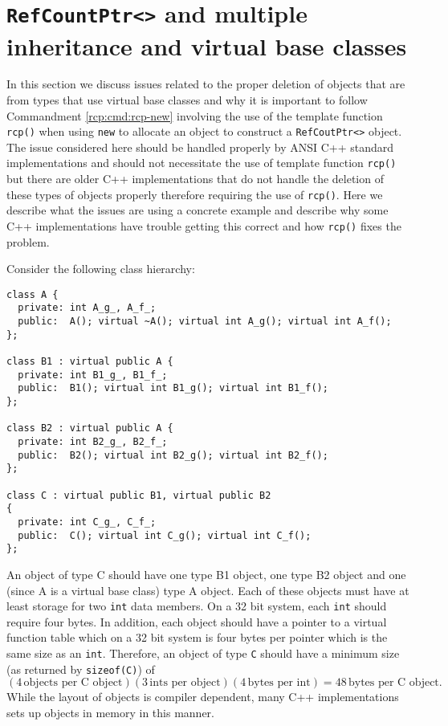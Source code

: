 %
\section{\texttt{RefCountPtr<>} and multiple inheritance and virtual base classes}
\label{rcp:apdx:mivbc}
%

In this section we discuss issues related to the proper deletion of
objects that are from types that use virtual base classes and why it
is important to follow Commandment \ref{rcp:cmd:rcp-new} involving the
use of the template function \texttt{rcp()} when using \texttt{new} to
allocate an object to construct a \texttt{RefCoutPtr<>} object.  The
issue considered here should be handled properly by ANSI C++ standard
implementations and should not necessitate the use of template
function \texttt{rcp()} but there are older C++ implementations that
do not handle the deletion of these types of objects properly
therefore requiring the use of \texttt{rcp()}.  Here we describe what
the issues are using a concrete example and describe why some C++
implementations have trouble getting this correct and how
\texttt{rcp()} fixes the problem.

Consider the following class hierarchy:

{\small\begin{verbatim}
class A {
  private: int A_g_, A_f_;
  public:  A(); virtual ~A(); virtual int A_g(); virtual int A_f();
};

class B1 : virtual public A {
  private: int B1_g_, B1_f_;
  public:  B1(); virtual int B1_g(); virtual int B1_f();
};

class B2 : virtual public A {
  private: int B2_g_, B2_f_;
  public:  B2(); virtual int B2_g(); virtual int B2_f();
};

class C : virtual public B1, virtual public B2
{
  private: int C_g_, C_f_;
  public:  C(); virtual int C_g(); virtual int C_f();
};
\end{verbatim}}


An object of type C should have one type B1 object, one type B2 object
and one (since A is a virtual base class) type A object.  Each of
these objects must have at least storage for two \texttt{int} data
members.  On a 32 bit system, each \texttt{int} should require four
bytes.  In addition, each object should have a pointer to a virtual
function table which on a 32 bit system is four bytes per pointer
which is the same size as an \texttt{int}.  Therefore, an object of
type \texttt{C} should have a minimum size (as returned by
\texttt{sizeof(C)}) of
%
\[
(4 \, \mbox{objects per C object})(3 \, \mbox{ints per object})(4 \, \mbox{bytes per int})
= 48 \, \mbox{bytes per C object}.
\]
%
While the layout of objects is compiler dependent, many C++
implementations sets up objects in memory in this manner.


